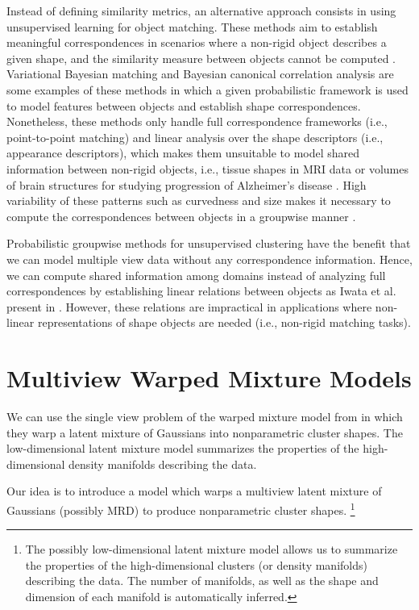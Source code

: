 \documentclass[]{article}
\begin{document}
Instead of defining similarity metrics, an alternative approach consists in using unsupervised learning for object
matching. These methods aim to establish meaningful correspondences in scenarios where a non-rigid object describes a
given shape, and the similarity measure between objects cannot be computed \cite{Yang13}. Variational Bayesian matching
\cite{Klami12} and Bayesian canonical correlation analysis \cite{Klami13_a} are some examples of these methods in which
a given probabilistic framework is used to model features between objects and establish shape
correspondences. Nonetheless, these methods only handle full correspondence frameworks (i.e., point-to-point matching)
and linear analysis over the shape descriptors (i.e., appearance descriptors), which makes them unsuitable to model shared
information between non-rigid objects, i.e., tissue shapes in MRI data \cite{vankaick11}  or volumes of brain structures for studying
progression of  Alzheimer's disease \cite{Thompson03,Derek10}. High variability of these patterns such as curvedness and size makes it necessary to compute the correspondences between objects in a groupwise manner \cite{Sidorov11}.

Probabilistic groupwise methods for unsupervised clustering have the benefit that we can model multiple view data without any correspondence information. Hence, we can compute shared information among domains instead of analyzing full correspondences by establishing linear relations between objects as Iwata et al. present in \cite{Iwata16}.   However, these relations are impractical in applications where non-linear representations of shape objects are needed (i.e., non-rigid matching tasks).
\section{Multiview Warped Mixture Models}

We can use the single view problem of the warped mixture model from \cite{IwaDuvGha2012warped} in which they warp a latent mixture of Gaussians into nonparametric cluster shapes. The low-dimensional latent mixture model summarizes the properties of the high-dimensional density manifolds describing the data.

Our idea is to introduce a model which warps a multiview latent mixture of Gaussians (possibly MRD) to produce nonparametric cluster shapes. \footnote{The possibly low-dimensional latent mixture model allows us to summarize the properties of the high-dimensional clusters
(or density manifolds) describing the data. The number of manifolds, as well as the shape and dimension of each manifold is automatically inferred.}
\end{document}
